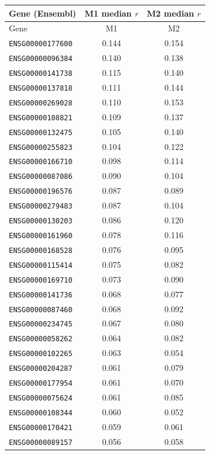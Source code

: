\begin{longtable}{lcc}\toprule
Gene (Ensembl) & M1 median $r$ & M2 median $r$ \\
\midrule
\endfirsthead
\toprule Gene & M1 & M2 \\ \midrule \endhead
\texttt{ENSG00000177600} & 0.144 & 0.154 \\
\texttt{ENSG00000096384} & 0.140 & 0.138 \\
\texttt{ENSG00000141738} & 0.115 & 0.140 \\
\texttt{ENSG00000137818} & 0.111 & 0.144 \\
\texttt{ENSG00000269028} & 0.110 & 0.153 \\
\texttt{ENSG00000108821} & 0.109 & 0.137 \\
\texttt{ENSG00000132475} & 0.105 & 0.140 \\
\texttt{ENSG00000255823} & 0.104 & 0.122 \\
\texttt{ENSG00000166710} & 0.098 & 0.114 \\
\texttt{ENSG00000087086} & 0.090 & 0.104 \\
\texttt{ENSG00000196576} & 0.087 & 0.089 \\
\texttt{ENSG00000279483} & 0.087 & 0.104 \\
\texttt{ENSG00000130203} & 0.086 & 0.120 \\
\texttt{ENSG00000161960} & 0.078 & 0.116 \\
\texttt{ENSG00000168528} & 0.076 & 0.095 \\
\texttt{ENSG00000115414} & 0.075 & 0.082 \\
\texttt{ENSG00000169710} & 0.073 & 0.090 \\
\texttt{ENSG00000141736} & 0.068 & 0.077 \\
\texttt{ENSG00000087460} & 0.068 & 0.092 \\
\texttt{ENSG00000234745} & 0.067 & 0.080 \\
\texttt{ENSG00000058262} & 0.064 & 0.082 \\
\texttt{ENSG00000102265} & 0.063 & 0.054 \\
\texttt{ENSG00000204287} & 0.061 & 0.079 \\
\texttt{ENSG00000177954} & 0.061 & 0.070 \\
\texttt{ENSG00000075624} & 0.061 & 0.085 \\
\texttt{ENSG00000108344} & 0.060 & 0.052 \\
\texttt{ENSG00000170421} & 0.059 & 0.061 \\
\texttt{ENSG00000089157} & 0.056 & 0.058 \\

\end{longtable}
